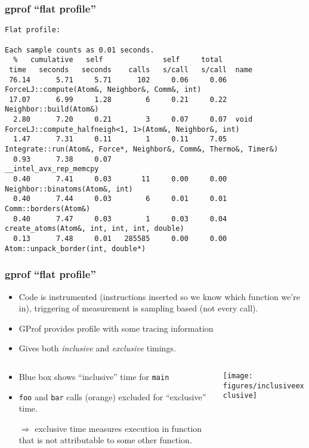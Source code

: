 \documentclass[presentation,aspectratio=43,10pt]{beamer}
\begin{document}
\begin{frame}[fragile]
  \frametitle{gprof ``flat profile''}
\begin{verbatim}
Flat profile:

Each sample counts as 0.01 seconds.
  %   cumulative   self              self     total
 time   seconds   seconds    calls   s/call   s/call  name
 76.14      5.71     5.71      102     0.06     0.06  ForceLJ::compute(Atom&, Neighbor&, Comm&, int)
 17.07      6.99     1.28        6     0.21     0.22  Neighbor::build(Atom&)
  2.80      7.20     0.21        3     0.07     0.07  void ForceLJ::compute_halfneigh<1, 1>(Atom&, Neighbor&, int)
  1.47      7.31     0.11        1     0.11     7.05  Integrate::run(Atom&, Force*, Neighbor&, Comm&, Thermo&, Timer&)
  0.93      7.38     0.07                             __intel_avx_rep_memcpy
  0.40      7.41     0.03       11     0.00     0.00  Neighbor::binatoms(Atom&, int)
  0.40      7.44     0.03        6     0.01     0.01  Comm::borders(Atom&)
  0.40      7.47     0.03        1     0.03     0.04  create_atoms(Atom&, int, int, int, double)
  0.13      7.48     0.01   285585     0.00     0.00  Atom::unpack_border(int, double*)
\end{verbatim}
\end{frame}
\begin{frame}
  \frametitle{gprof ``flat profile''}
  \begin{itemize}
  \item Code is instrumented (instructions inserted so we know which
    function we're in), triggering of measurement is sampling based
    (not every call).
  \item GProf provides profile with some tracing information
  \item Gives both \emph{inclusive} and \emph{exclusive} timings.
  \end{itemize}
  \begin{columns}
    \begin{column}{0.45\textwidth}
      \begin{itemize}
      \item Blue box shows ``inclusive'' time for \texttt{main}
      \item \texttt{foo} and \texttt{bar} calls (orange) excluded for
        ``exclusive'' time.
      \item[$\Rightarrow$] exclusive time measures execution in
        function that is not attributable to some other function.
      \end{itemize}
    \end{column}
    \begin{column}{0.45\textwidth}
      \begin{center}
        \texttt{[image: figures/inclusiveexclusive]}
      \end{center}
    \end{column}
  \end{columns}
\end{frame}
\end{document}
